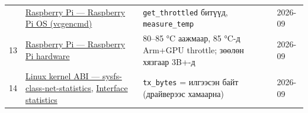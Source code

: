 \begin{longtable}[]{@{}llll@{}}
\begin{minipage}[t]{0.22\columnwidth}
\end{minipage} & \begin{minipage}[t]{0.22\columnwidth}\raggedright
\href{https://www.raspberrypi.com/documentation/computers/os.html}{Raspberry Pi --- Raspberry Pi OS (vcgencmd)}\strut
\end{minipage} & \begin{minipage}[t]{0.22\columnwidth}\raggedright
\texttt{get\_throttled} битүүд, \texttt{measure\_temp}\strut
\end{minipage} & \begin{minipage}[t]{0.22\columnwidth}\raggedright
2026-09\strut
\end{minipage}\tabularnewline
\begin{minipage}[t]{0.22\columnwidth}\raggedright
13\strut
\end{minipage} & \begin{minipage}[t]{0.22\columnwidth}\raggedright
\href{https://www.raspberrypi.com/documentation/computers/raspberry-pi.html}{Raspberry Pi --- Raspberry Pi hardware}\strut
\end{minipage} & \begin{minipage}[t]{0.22\columnwidth}\raggedright
80--85 °C аажмаар, 85 °C-д Arm+GPU throttle; зөөлөн хязгаар 3B+-д\strut
\end{minipage} & \begin{minipage}[t]{0.22\columnwidth}\raggedright
2026-09\strut
\end{minipage}\tabularnewline
\begin{minipage}[t]{0.22\columnwidth}\raggedright
14\strut
\end{minipage} & \begin{minipage}[t]{0.22\columnwidth}\raggedright
\href{https://docs.kernel.org/admin-guide/abi-testing.html}{Linux kernel ABI --- sysfs-class-net-statistics}, \href{https://docs.kernel.org/networking/statistics.html}{Interface statistics}\strut
\end{minipage} & \begin{minipage}[t]{0.22\columnwidth}\raggedright
\texttt{tx\_bytes} = илгээсэн байт (драйверээс хамаарна)\strut
\end{minipage} & \begin{minipage}[t]{0.22\columnwidth}\raggedright
2026-09\strut
\end{minipage}\tabularnewline
\bottomrule
\end{longtable}\endgroup
